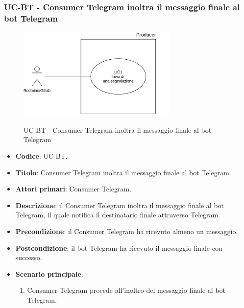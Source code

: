 \subsubsection{UC\theuccount-BT - Consumer Telegram inoltra il messaggio finale al bot Telegram}
	\begin{figure}[H]
		\centering
		\includegraphics[width=0.7\textwidth]{img/UC1.png}\\
		\caption{UC\theuccount-BT - Consumer Telegram inoltra il messaggio finale al bot Telegram}
	\end{figure}
	\begin{itemize}
		\item \textbf{Codice}: UC\theuccount-BT.
		\item \textbf{Titolo}: Consumer Telegram inoltra il messaggio finale al bot Telegram.
		\item \textbf{Attori primari}: Consumer Telegram.
		\item \textbf{Descrizione}: il Consumer Telegram inoltra il messaggio finale al bot Telegram, il quale notifica il destinatario finale attraverso Telegram.
		\item \textbf{Precondizione}: il Consumer Telegram ha ricevuto almeno un messaggio.
		\item \textbf{Postcondizione}: il bot Telegram ha ricevuto il messaggio finale con successo.
		\item \textbf{Scenario principale}: 
		\begin{enumerate}
			\item Consumer Telegram procede all'inoltro del messaggio finale al bot Telegram.
		\end{enumerate}
		
	\end{itemize}